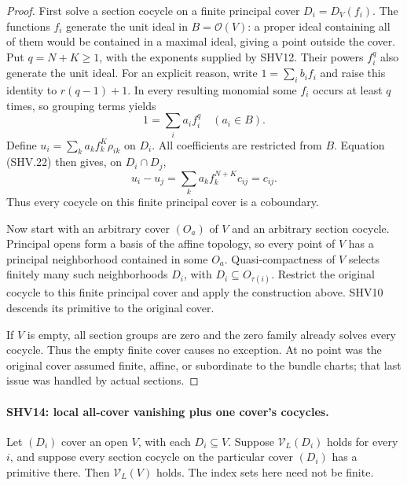 \begin{proof}
First solve a section cocycle on a finite principal cover
$D_i=D_V(f_i)$.  The functions $f_i$ generate the unit ideal
in $B=\mathcal O(V)$: a proper ideal containing all of them
would be contained in a maximal ideal, giving a point outside
the cover.  Put $q=N+K\ge1$, with the exponents supplied
by SHV12.  Their powers $f_i^q$ also generate the unit ideal.
For an explicit reason, write $1=\sum_i b_i f_i$ and raise
this identity to $r(q-1)+1$.  In every resulting monomial
some $f_i$ occurs at least $q$ times, so grouping terms yields
\[
                         1=\sum_i a_i f_i^q
                         \quad(a_i\in B).
                                                        \tag{SHV.24}
\]
Define
$u_i=\sum_k a_k f_k^K\rho_{ik}$ on $D_i$.
All coefficients are restricted from $B$.  Equation (SHV.22)
then gives, on $D_i\cap D_j$,
\[
 u_i-u_j
   =\sum_k a_k f_k^{N+K}c_{ij}
   =c_{ij}.
\]
Thus every cocycle on this finite principal cover is a coboundary.

Now start with an arbitrary cover $(O_a)$ of $V$ and an
arbitrary section cocycle.  Principal opens form a basis of the
affine topology, so every point of $V$ has a principal
neighborhood contained in some $O_a$.  Quasi-compactness of $V$
selects finitely many such neighborhoods $D_i$, with
$D_i\subseteq O_{\tau(i)}$.  Restrict the original cocycle to
this finite principal cover and apply the construction above.
SHV10 descends its primitive to the original cover.

If $V$ is empty, all section groups are zero and the zero
family already solves every cocycle.  Thus the empty finite
cover causes no exception.  At no point was the original
cover assumed finite, affine, or subordinate to the bundle
charts; that last issue was handled by actual sections.
\end{proof}

\paragraph{SHV14: local all-cover vanishing plus one cover's cocycles.}
\label{claim:SHV14}
Let $(D_i)$ cover an open $V$, with each $D_i\subseteq V$.
Suppose $\mathcal V_L(D_i)$ holds for every $i$, and suppose
every section cocycle on the particular cover $(D_i)$ has
a primitive there.  Then $\mathcal V_L(V)$ holds.  The index
sets here need not be finite.

